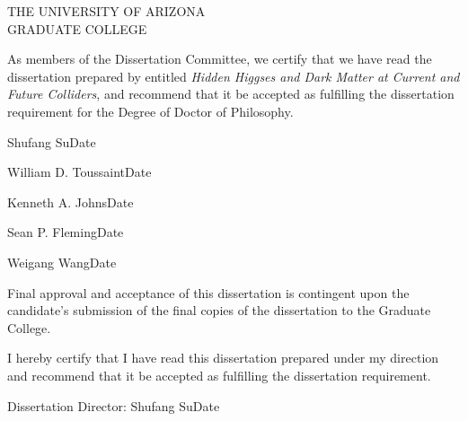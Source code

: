 \begin{center}
  {\scshape THE UNIVERSITY OF ARIZONA\\
  GRADUATE COLLEGE}
\end{center}
As members of the Dissertation Committee, we certify that we have read the dissertation prepared by {\@author} entitled \emph{Hidden Higgses and Dark Matter at Current and Future Colliders}, and recommend that it be accepted as fulfilling the dissertation requirement for the Degree of Doctor of Philosophy.
\vfill

\noindent \hrulefill

\smallskip

\noindent Shufang Su\hfill Date
\bigskip\bigskip

\noindent \hrulefill
\smallskip

\noindent William D. Toussaint\hfill Date
\bigskip\bigskip

\noindent \hrulefill
\smallskip

\noindent Kenneth A. Johns\hfill Date
\bigskip\bigskip

\noindent \hrulefill

\smallskip

\noindent Sean P. Fleming\hfill Date
\bigskip\bigskip

\noindent \hrulefill

\smallskip

\noindent Weigang Wang\hfill Date
\vfill

\noindent Final approval and acceptance of this dissertation is contingent upon the candidate’s submission of the final copies of the dissertation to the Graduate College. 

\vfill
\noindent I hereby certify that I have read this dissertation prepared under my direction and recommend that it be accepted as fulfilling the dissertation requirement.

\bigskip\bigskip
\noindent\hrulefill
\smallskip

\noindent Dissertation Director: Shufang Su\hfill Date

